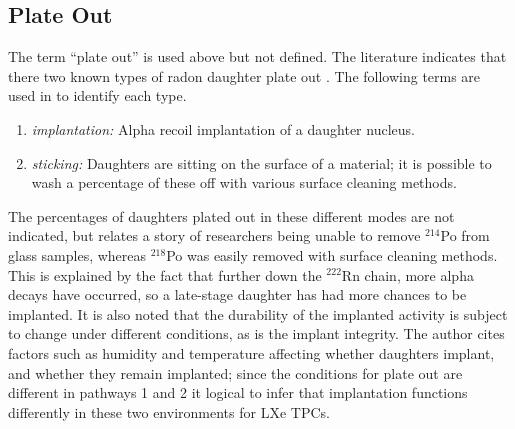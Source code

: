 
\subsection{Plate Out}
\label{sec:plateout}
The term ``plate out'' is used above but not defined. The literature indicates that there two known types of radon daughter plate out \cite{Samuelsson1996}. The following terms are used in \cite{Samuelsson1996} to identify each type.

\begin{enumerate}
\item \textit{implantation:} Alpha recoil implantation of a daughter nucleus.
\item \textit{sticking:} Daughters are sitting on the surface of a material; it is possible to wash a percentage of these off with various surface cleaning methods.
\end{enumerate}

The percentages of daughters plated out in these different modes are not indicated, but \cite{Samuelsson1996} relates a story of researchers being unable to remove $^{214}$Po from glass samples, whereas $^{218}$Po was easily removed with surface cleaning methods. This is explained by the fact that further down the $^{222}$Rn chain, more alpha decays have occurred, so a late-stage daughter has had more chances to be implanted. It is also noted that the durability of the implanted activity is subject to change under different conditions, as is the implant integrity. The author cites factors such as humidity and temperature affecting whether daughters implant, and whether they remain implanted; since the conditions for plate out are different in pathways 1 and 2 it logical to infer that implantation functions differently in these two environments for \ac{LXe} \ac{TPC}s. 

